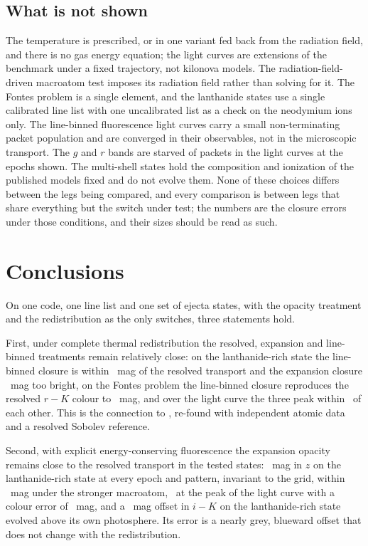 \documentclass[fleqn,usenatbib]{mnras}
\begin{document}
\subsection{What is not shown}

The temperature is prescribed, or in one variant fed back from the radiation field, and there is no gas energy equation; the light curves are extensions of the benchmark under a fixed trajectory, not kilonova models. The radiation-field-driven macroatom test imposes its radiation field rather than solving for it. The Fontes problem is a single element, and the lanthanide states use a single calibrated line list with one uncalibrated list as a check on the neodymium ions only. The line-binned fluorescence light curves carry a small non-terminating packet population and are converged in their observables, not in the microscopic transport. The $g$ and $r$ bands are starved of packets in the light curves at the epochs shown. The multi-shell states hold the composition and ionization of the published models fixed and do not evolve them. None of these choices differs between the legs being compared, and every comparison is between legs that share everything but the switch under test; the numbers are the closure errors under those conditions, and their sizes should be read as such.

\section{Conclusions}\label{sec:conclusions}

On one code, one line list and one set of ejecta states, with the opacity treatment and the redistribution as the only switches, three statements hold.

First, under complete thermal redistribution the resolved, expansion and line-binned treatments remain relatively close: on the lanthanide-rich state the line-binned closure is within \BbinthRthPoneAbsmax\ mag of the resolved transport and the expansion closure \BthRthPone\ mag too bright, on the Fontes problem the line-binned closure reproduces the resolved $r-K$ colour to \FontesEpsBbinRthRK\ mag, and over the light curve the three peak within \LcBthDL\ of each other. This is the connection to \citet{fontes2020}, re-found with independent atomic data and a resolved Sobolev reference.

Second, with explicit energy-conserving fluorescence the expansion opacity remains close to the resolved transport in the tested states: \BtwoRtwoZPone\ mag in $z$ on the lanthanide-rich state at every epoch and pattern, invariant to the grid, within \MacroBtwoAbsmax\ mag under the stronger macroatom, \LcBtwoDL\ at the peak of the light curve with a colour error of \LcBtwoColour\ mag, and a \PxBtwoIK\ mag offset in $i-K$ on the lanthanide-rich state evolved above its own photosphere. Its error is a nearly grey, blueward offset that does not change with the redistribution.
\end{document}
